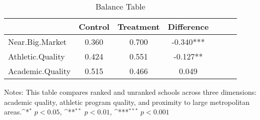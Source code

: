 \begin{table}[htbp]\centering
\def\sym#1{\ifmmode^{#1}\else\(^{#1}\)\fi}
\caption{\label{tab:balance} Balance Table}
\begin{tabular}{l*{6}{c}}
                    &     Control&   Treatment&  Difference   \\
\hline
Near.Big.Market     &       0.360&       0.700&      -0.340***\\
Athletic.Quality    &       0.424&       0.551&      -0.127** \\
Academic.Quality    &       0.515&       0.466&       0.049   \\
\end{tabular}
\vspace{3mm}
{\parbox{4in}{\footnotesize Notes: This table compares ranked and unranked schools across three dimensions: academic quality, athletic program quality, and proximity to large metropolitan areas.\sym{*} \(p<0.05\), \sym{**} \(p<0.01\), \sym{***} \(p<0.001\)
}}
\end{table}
